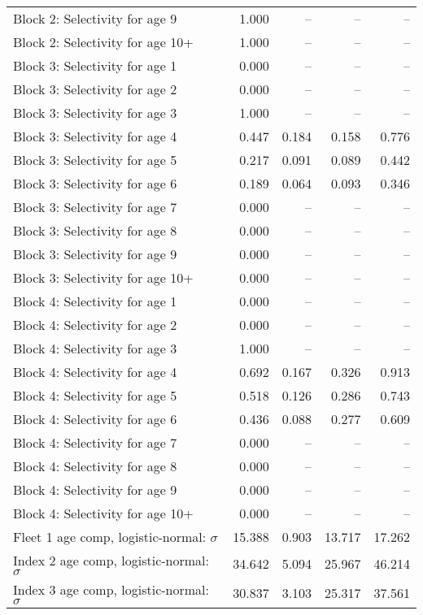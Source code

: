 \documentclass[
]{article}
\begin{document}
\begin{landscape}
\begin{longtable}[t]{lrrrr}
Block 2: Selectivity for age 9 & 1.000 & -- & -- & --\\
Block 2: Selectivity for age 10+ & 1.000 & -- & -- & --\\
Block 3: Selectivity for age 1 & 0.000 & -- & -- & --\\
Block 3: Selectivity for age 2 & 0.000 & -- & -- & --\\
\addlinespace
Block 3: Selectivity for age 3 & 1.000 & -- & -- & --\\
Block 3: Selectivity for age 4 & 0.447 & 0.184 & 0.158 & 0.776\\
Block 3: Selectivity for age 5 & 0.217 & 0.091 & 0.089 & 0.442\\
Block 3: Selectivity for age 6 & 0.189 & 0.064 & 0.093 & 0.346\\
Block 3: Selectivity for age 7 & 0.000 & -- & -- & --\\
\addlinespace
Block 3: Selectivity for age 8 & 0.000 & -- & -- & --\\
Block 3: Selectivity for age 9 & 0.000 & -- & -- & --\\
Block 3: Selectivity for age 10+ & 0.000 & -- & -- & --\\
Block 4: Selectivity for age 1 & 0.000 & -- & -- & --\\
Block 4: Selectivity for age 2 & 0.000 & -- & -- & --\\
\addlinespace
Block 4: Selectivity for age 3 & 1.000 & -- & -- & --\\
Block 4: Selectivity for age 4 & 0.692 & 0.167 & 0.326 & 0.913\\
Block 4: Selectivity for age 5 & 0.518 & 0.126 & 0.286 & 0.743\\
Block 4: Selectivity for age 6 & 0.436 & 0.088 & 0.277 & 0.609\\
Block 4: Selectivity for age 7 & 0.000 & -- & -- & --\\
\addlinespace
Block 4: Selectivity for age 8 & 0.000 & -- & -- & --\\
Block 4: Selectivity for age 9 & 0.000 & -- & -- & --\\
Block 4: Selectivity for age 10+ & 0.000 & -- & -- & --\\
Fleet 1 age comp, logistic-normal: $\sigma$ & 15.388 & 0.903 & 13.717 & 17.262\\
Index 2 age comp, logistic-normal: $\sigma$ & 34.642 & 5.094 & 25.967 & 46.214\\
\addlinespace
Index 3 age comp, logistic-normal: $\sigma$ & 30.837 & 3.103 & 25.317 & 37.561\\*
\end{longtable}
\end{landscape}
\end{document}

